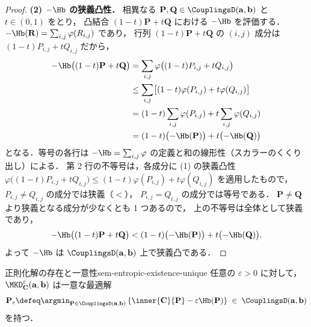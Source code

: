 \begin{proof}
  \textbf{(2) $-\Hb$ の狭義凸性．}
  相異なる $\mathbf{P}, \mathbf{Q} \in \CouplingsD(\mathbf{a}, \mathbf{b})$ と $t \in (0,1)$ をとり，
  凸結合 $(1-t)\mathbf{P} + t\mathbf{Q}$ における $-\Hb$ を評価する．
  $-\Hb(\mathbf{R}) = \sum_{i,j}\varphi(R_{i,j})$ であり，
  行列 $(1-t)\mathbf{P} + t\mathbf{Q}$ の $(i,j)$ 成分は $(1-t)P_{i,j} + tQ_{i,j}$ だから，
  \begin{align*}
    -\Hb\bigl((1-t)\mathbf{P} + t\mathbf{Q}\bigr)
    &= \sum_{i,j}\varphi\bigl((1-t)P_{i,j} + tQ_{i,j}\bigr) \\
    &\leq \sum_{i,j}\bigl[(1-t)\varphi(P_{i,j}) + t\varphi(Q_{i,j})\bigr] \\
    &= (1-t)\sum_{i,j}\varphi(P_{i,j}) + t\sum_{i,j}\varphi(Q_{i,j}) \\
    &= (1-t)\bigl(-\Hb(\mathbf{P})\bigr) + t\bigl(-\Hb(\mathbf{Q})\bigr)
  \end{align*}
  となる．等号の各行は $-\Hb = \sum_{i,j}\varphi$ の定義と和の線形性（スカラーのくくり出し）による．
  第 2 行の不等号は，各成分に (1) の狭義凸性
  $\varphi\bigl((1-t)P_{i,j}+tQ_{i,j}\bigr) \leq (1-t)\varphi(P_{i,j}) + t\varphi(Q_{i,j})$
  を適用したもので，$P_{i,j} \neq Q_{i,j}$ の成分では狭義（$<$），
  $P_{i,j} = Q_{i,j}$ の成分では等号である．
  $\mathbf{P} \neq \mathbf{Q}$ より狭義となる成分が少なくとも 1 つあるので，
  上の不等号は全体として狭義であり，
  \[
    -\Hb\bigl((1-t)\mathbf{P} + t\mathbf{Q}\bigr)
    < (1-t)\bigl(-\Hb(\mathbf{P})\bigr) + t\bigl(-\Hb(\mathbf{Q})\bigr).
  \]
  よって $-\Hb$ は $\CouplingsD(\mathbf{a}, \mathbf{b})$ 上で狭義凸である．
\end{proof}

\begin{proposition}{正則化解の存在と一意性}{sem-entropic-existence-unique}
  任意の $\varepsilon > 0$ に対して，
  $\MKD_{\mathbf{C}}^\varepsilon(\mathbf{a}, \mathbf{b})$ は一意な最適解
  \[
    \mathbf{P}_\varepsilon
    \defeq
    \argmin_{\mathbf{P} \in \CouplingsD(\mathbf{a}, \mathbf{b})}
    \left\{
      \inner{\mathbf{C}}{\mathbf{P}}
      - \varepsilon \Hb(\mathbf{P})
    \right\}
    \;\in\; \CouplingsD(\mathbf{a}, \mathbf{b})
  \]
  を持つ．
\end{proposition}

